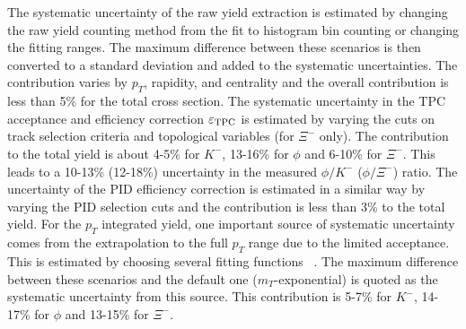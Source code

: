 \documentclass[%
 reprint,	
showpacs,
 amsmath,amssymb,
 aps,
 prc,
]{revtex4-1}
\begin{document}
The systematic uncertainty of the raw yield extraction is estimated by changing the raw yield counting method from the fit to histogram bin counting or changing the fitting ranges. The maximum difference between these scenarios is then converted to a standard deviation and added to the systematic uncertainties. The contribution varies by $p_T$, rapidity, and centrality %
and the overall contribution is less than 5\% for the total cross section. The systematic uncertainty in the TPC acceptance and efficiency correction $\varepsilon_{\rm TPC}$ is estimated %
by varying the cuts on track selection criteria and topological variables (for $\Xi^-$ only). %
The contribution to the total yield is about 4-5\% for $K^-$, 13-16\% for $\phi$ and 6-10\% for $\Xi^-$. This leads to a 10-13\% (12-18\%) uncertainty in the measured $\phi/K^-$ ($\phi/\Xi^-$) ratio. 
The uncertainty of the PID efficiency correction is estimated in a similar way by varying the PID selection cuts and the contribution is less than 3\% to the total yield.
For the $p_T$ integrated yield, one important source of systematic uncertainty comes from the extrapolation to the full $p_T$ range due to the limited acceptance. This is estimated by choosing several fitting functions %
~\cite{STAR_particleYield}. The maximum difference between these scenarios and the default one ($m_T$-exponential) is quoted as the systematic uncertainty from this source. This contribution is 5-7\% for $K^-$, 14-17\% for $\phi$ and 13-15\% for $\Xi^-$. 
\end{document}
